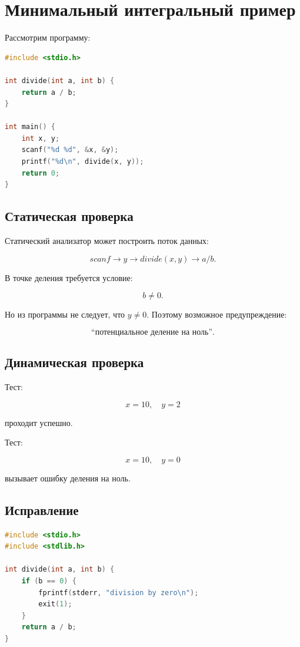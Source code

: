 \documentclass[12pt,a4paper]{article}
\begin{document}
\section{Минимальный интегральный пример}

Рассмотрим программу:

\begin{lstlisting}[language=C]
#include <stdio.h>

int divide(int a, int b) {
    return a / b;
}

int main() {
    int x, y;
    scanf("%d %d", &x, &y);
    printf("%d\n", divide(x, y));
    return 0;
}
\end{lstlisting}

\subsection{Статическая проверка}

Статический анализатор может построить поток данных:

\[
scanf \to y \to divide(x,y) \to a/b.
\]

В точке деления требуется условие:

\[
b \ne 0.
\]

Но из программы не следует, что $y \ne 0$. Поэтому возможное предупреждение:

\[
\text{``потенциальное деление на ноль''}.
\]

\subsection{Динамическая проверка}

Тест:

\[
x=10,\quad y=2
\]

проходит успешно.

Тест:

\[
x=10,\quad y=0
\]

вызывает ошибку деления на ноль.

\subsection{Исправление}

\begin{lstlisting}[language=C]
#include <stdio.h>
#include <stdlib.h>

int divide(int a, int b) {
    if (b == 0) {
        fprintf(stderr, "division by zero\n");
        exit(1);
    }
    return a / b;
}
\end{lstlisting}
\end{document}
